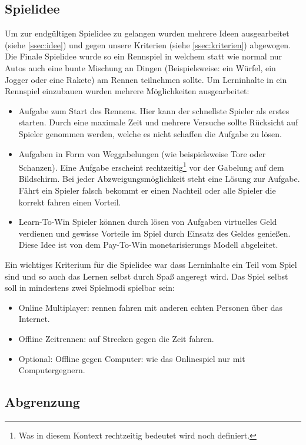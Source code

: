 \subsection{Spielidee}
	Um zur endgültigen Spielidee zu gelangen wurden mehrere Ideen ausgearbeitet (siehe \ref{ssec:idee}) und gegen unsere Kriterien (siehe \ref{ssec:kriterien}) abgewogen.
	Die Finale Spielidee wurde so ein Rennspiel in welchem statt wie normal nur Autos auch eine bunte Mischung an Dingen (Beispielsweise: ein Würfel, ein Jogger oder eine Rakete) am Rennen teilnehmen sollte. Um Lerninhalte in ein Rennspiel einzubauen wurden mehrere Möglichkeiten ausgearbeitet:
	\begin{itemize}
		\item{ Aufgabe zum Start des Rennens. Hier kann der schnellste Spieler als erstes starten. Durch eine maximale Zeit und mehrere Versuche sollte Rücksicht auf Spieler genommen werden, welche es nicht schaffen die Aufgabe zu lösen. }
		\item{ Aufgaben in Form von Weggabelungen (wie beispielsweise Tore oder Schanzen). Eine Aufgabe erscheint rechtzeitig\footnote{Was in diesem Kontext rechtzeitig bedeutet wird noch definiert.} vor der Gabelung auf dem Bildschirm. Bei jeder Abzweigungsmöglichkeit steht eine Lösung zur Aufgabe. Fährt ein Spieler falsch  bekommt er einen Nachteil oder alle Spieler die korrekt fahren einen Vorteil. }
		\item{ Learn-To-Win Spieler können durch lösen von Aufgaben virtuelles Geld verdienen und gewisse Vorteile im Spiel durch Einsatz des Geldes genießen. Diese Idee ist von dem Pay-To-Win monetarisierungs Modell abgeleitet. }
	\end{itemize}
	Ein wichtiges Kriterium für die Spielidee war dass Lerninhalte ein Teil vom Spiel sind und so auch das Lernen selbst durch Spaß angeregt wird.
	Das Spiel selbst soll in mindestens zwei Spielmodi spielbar sein:
	\begin{itemize}
		\item{ Online Multiplayer: rennen fahren mit anderen echten Personen über das Internet. }
		\item{ Offline Zeitrennen: auf Strecken gegen die Zeit fahren. }
		\item{ Optional: Offline gegen Computer: wie das Onlinespiel nur mit Computergegnern. }
	\end{itemize}
\subsection{Abgrenzung}
